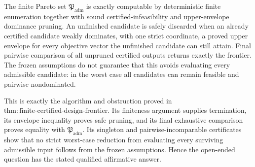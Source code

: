 The finite Pareto set \(\mathfrak P_{\mathrm{adm}}\) is exactly computable by deterministic finite enumeration together with sound certified-infeasibility and upper-envelope dominance pruning.  An unfinished candidate is safely discarded when an already certified candidate weakly dominates, with one strict coordinate, a proved upper envelope for every objective vector the unfinished candidate can still attain.  Final pairwise comparison of all unpruned certified outputs returns exactly the frontier.  The frozen assumptions do not guarantee that this avoids evaluating every admissible candidate: in the worst case all candidates can remain feasible and pairwise nondominated.

This is exactly the algorithm and obstruction proved in \(\mathrm{thm{:}finite\text{-}certified\text{-}design\text{-}frontier}\).  Its finiteness argument supplies termination, its envelope inequality proves safe pruning, and its final exhaustive comparison proves equality with \(\mathfrak P_{\mathrm{adm}}\).  Its singleton and pairwise-incomparable certificates show that no strict worst-case reduction from evaluating every surviving admissible input follows from the frozen assumptions.  Hence the open-ended question has the stated qualified affirmative answer.
